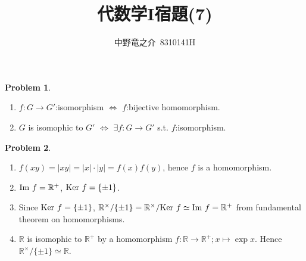 \documentclass[a4paper, 12pt, fleqn]{article}
\title{代数学I宿題(7)}
\author{中野竜之介\ 8310141H}
\theoremstyle{definition}
\newtheorem{prb}{Problem}
\newcommand{\image}[1]{{\rm Im\ }#1}
\newcommand{\kernel}[1]{{\rm Ker\ }#1}
\begin{document}
\maketitle

\begin{prb}
    $ $
    \begin{enumerate}
        \item $f:G\to G'$:isomorphism $\Leftrightarrow$ $f$:bijective homomorphism.
        \item $G$ is isomophic to $G'$ $\Leftrightarrow$ $\exists f:G\to G'$ s.t. $f$:isomorphism.
    \end{enumerate}
\end{prb}

\begin{prb}
    $ $
    \begin{enumerate}
        \item $f(xy) = |xy|=|x|\cdot|y| = f(x)f(y)$, hence $f$ is a homomorphism.
        \item $\image{f} = \mathbb{R}^{+}$, $\kernel{f}=\{\pm 1\}$.
        \item Since $\kernel{f} = \{\pm 1\}$, $\mathbb{R}^{\times} / \{\pm 1\}=\mathbb{R}^{\times} / \kernel{f}  \simeq \image{f} = \mathbb{R}^{+}$ from fundamental theorem on homomorphisms.
        \item $\mathbb{R}$ is isomophic to $\mathbb{R}^{+}$ by a homomorphism $f:\mathbb{R}\to \mathbb{R}^{+};x \mapsto \exp{x}$. Hence $\mathbb{R}^{\times} /\{\pm 1\} \simeq \mathbb{R}$.
    \end{enumerate}
\end{prb}
\end{document}
